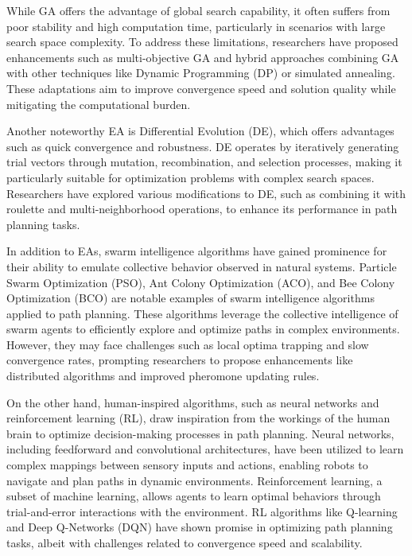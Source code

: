 \vspace{3mm}


While GA offers the advantage of global search capability, it often suffers from poor stability and high computation time, particularly in scenarios with large search space complexity. To address these limitations, researchers have proposed enhancements such as multi-objective GA and hybrid approaches combining GA with other techniques like Dynamic Programming (DP) or simulated annealing. These adaptations aim to improve convergence speed and solution quality while mitigating the computational burden.

\vspace{3mm}


Another noteworthy EA is Differential Evolution (DE), which offers advantages such as quick convergence and robustness. DE operates by iteratively generating trial vectors through mutation, recombination, and selection processes, making it particularly suitable for optimization problems with complex search spaces. Researchers have explored various modifications to DE, such as combining it with roulette and multi-neighborhood operations, to enhance its performance in path planning tasks.

\vspace{3mm}


In addition to EAs, swarm intelligence algorithms have gained prominence for their ability to emulate collective behavior observed in natural systems. Particle Swarm Optimization (PSO), Ant Colony Optimization (ACO), and Bee Colony Optimization (BCO) are notable examples of swarm intelligence algorithms applied to path planning. These algorithms leverage the collective intelligence of swarm agents to efficiently explore and optimize paths in complex environments. However, they may face challenges such as local optima trapping and slow convergence rates, prompting researchers to propose enhancements like distributed algorithms and improved pheromone updating rules.

\vspace{3mm}


On the other hand, human-inspired algorithms, such as neural networks and reinforcement learning (RL), draw inspiration from the workings of the human brain to optimize decision-making processes in path planning. Neural networks, including feedforward and convolutional architectures, have been utilized to learn complex mappings between sensory inputs and actions, enabling robots to navigate and plan paths in dynamic environments. Reinforcement learning, a subset of machine learning, allows agents to learn optimal behaviors through trial-and-error interactions with the environment. RL algorithms like Q-learning and Deep Q-Networks (DQN) have shown promise in optimizing path planning tasks, albeit with challenges related to convergence speed and scalability.

